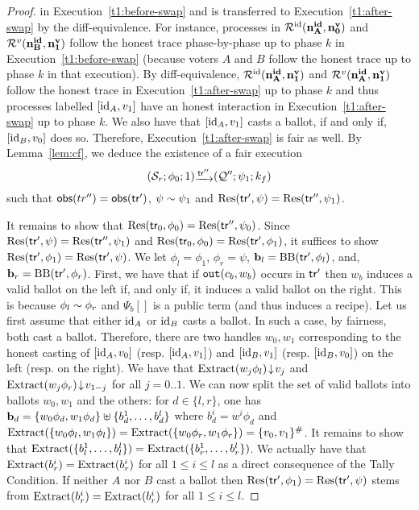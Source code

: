 \begin{proof}
in Execution~\ref{t1:before-swap} and is transferred to Execution~\ref{t1:after-swap} by
the diff-equivalence.
For instance, processes
in $\mathcal{R}^{\mathrm{id}}({\mathbf{n^{id}_{A}}},{\mathbf{n^{v}_{0}}})$ and $\mathcal{R}^v({\mathbf{n^{id}_{B}}},{\mathbf{n^{v}_{1}}})$ follow the honest trace phase-by-phase
up to phase $k$ in Execution~\ref{t1:before-swap} (because voters $A$ and $B$ follow the honest trace up to phase $k$
in that execution).
By diff-equivalence, $\mathcal{R}^{\mathrm{id}}({\mathbf{n^{id}_{A}}},{\mathbf{n^{v}_{1}}})$ and $\mathcal{R}^v({\mathbf{n^{id}_{A}}},{\mathbf{n^{v}_{1}}})$ follow the
honest trace in Execution~\ref{t1:after-swap} up to phase $k$ and thus 
processes labelled $[\mathrm{id}_A,v_1]$ have an honest interaction in Execution~\ref{t1:after-swap} up to phase $k$.
We also have that $[\mathrm{id}_A,v_1]$ casts a ballot, if and only if, $[\mathrm{id}_B,v_0]$ does so. Therefore,
Execution~\ref{t1:after-swap} is fair as well.
By Lemma~\ref{lem:cf}, we deduce the existence of a fair execution
\begin{equation*}
(\S_r;\phi_0;1)\sint{\tr''}(\q'';\psi_1;k_f)
\end{equation*}
such that  $\mathsf{obs}(tr'')=\mathsf{obs}(\mathsf{tr}')$,
$\psi\sim\psi_1$ and
$\mathrm{Res}(\mathsf{tr}',\psi)= \mathrm{Res}(\mathsf{tr}'',\psi_1)$.
\smallskip{}

It remains to show that $\mathrm{Res}(\mathsf{tr}_0,\phi_0)=\mathrm{Res}(\mathsf{tr}'',\psi_0)$.
Since
$\mathrm{Res}(\mathsf{tr}',\psi)=\mathrm{Res}(\mathsf{tr}'',\psi_1)$
and
$\mathrm{Res}(\mathsf{tr}_0,\phi_0)=\mathrm{Res}(\mathsf{tr}',\phi_1)$,
it suffices to show 
$\mathrm{Res}(\mathsf{tr}',\phi_1)=\mathrm{Res}(\mathsf{tr}',\psi)$.
We let $\phi_l=\phi_1$, $\phi_r=\psi$,
${\mathbf{b}}_l=\mathrm{BB}(\mathsf{tr}',\phi_l)$, and,
${\mathbf{b}}_r=\mathrm{BB}(\mathsf{tr}',\phi_r)$.
First, we have that if $\mathtt{out}(c_b,w_b)$ occurs in $\mathsf{tr}'$ then
$w_b$ induces a valid ballot on the left if, and only if, it induces a valid ballot
on the right. This is because $\phi_l\sim\phi_r$ and $\Psi_b[]$ is a public term (and thus induces a recipe).
Let us first assume that either $\mathrm{id}_A$ or $\mathrm{id}_B$ casts a ballot. In such a case, by fairness, both cast a ballot.
Therefore, there are two handles $w_0,w_1$ corresponding to the honest casting of $[\mathrm{id}_A,v_0]$ (resp. $[\mathrm{id}_A,v_1]$)
and $[\mathrm{id}_B,v_1]$ (resp. $[\mathrm{id}_B,v_0]$)
on the left (resp. on the right). We have that
$\mathrm{Extract}(w_j\phi_l)\!\downarrow\! v_j$
and
$\mathrm{Extract}(w_j\phi_r)\!\downarrow\! v_{1-j}$
for all $j=0..1$.
We can now split the set of valid ballots into ballots $w_0,w_1$ and the others: for $d\in\{l,r\}$,
one has ${\mathbf{b}}_d=\{w_0\phi_d,w_1\phi_d\}\uplus\{b_d^1,\ldots,b_d^l\}$
where $b_d^i=w^i\phi_d$
and $\mathrm{Extract}(\{w_0\phi_l,w_1\phi_l\})=
\mathrm{Extract}(\{w_0\phi_r,w_1\phi_r\})=\{v_0,v_1\}^\#$. It remains to show that
$\mathrm{Extract}(\{b_l^1,\ldots,b_l^l\})=
\mathrm{Extract}(\{b_r^1,\ldots,b_r^l\})$.
We actually have that 
$\mathrm{Extract}(b_r^i)=
\mathrm{Extract}(b_r^i)$ for all $1\le i\le l$
as a direct consequence of the Tally Condition.
If neither $A$ nor $B$ cast a ballot then $\mathrm{Res}(\mathsf{tr}',\phi_1)=\mathrm{Res}(\mathsf{tr}',\psi)$
stems from $\mathrm{Extract}(b_r^i)=\mathrm{Extract}(b_r^i)$ for all $1\le i\le l$.


\end{proof}
